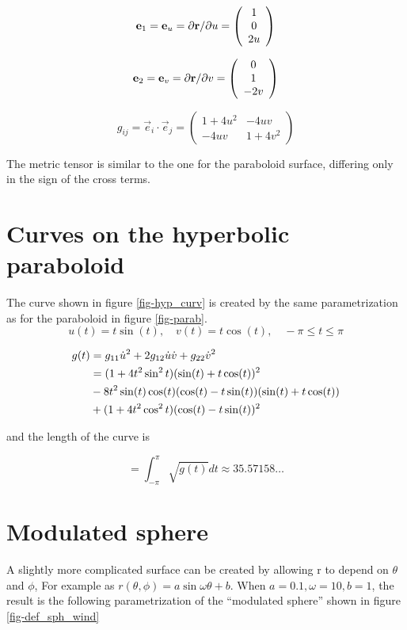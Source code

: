 $$
   \mathbf{e}_1 = \mathbf{e}_u = \partial\mathbf{r}/\partial u = \left( \begin{array}{c} 
        1 \\
        0 \\
        2u 
   \end{array} \right)
$$

$$
   \mathbf{e}_2 = \mathbf{e}_v = \partial\mathbf{r}/\partial v = \left( \begin{array}{c} 
        0 \\
        1 \\
        -2v 
   \end{array} \right)
$$

$$
    g_{ij} = \vec{e}_i\cdot\vec{e}_j = \left( \begin{array}{ccc}
      1 +4u^2 & -4uv \\
      -4uv & 1 + 4v^2 
    \end{array} \right)
$$

The metric tensor is similar to the one for the paraboloid surface, differing only
in the sign of the cross terms.




\section{Curves on the hyperbolic paraboloid}
The curve shown in figure \ref{fig-hyp_curv} is created by the same parametrization as 
for the paraboloid in figure \ref{fig-parab}.
$$
u(t)=t\sin(t),\quad v(t)=t\cos(t),\quad -\pi\le t \le \pi
$$

\begin{align}
   g(t) &= g_{11}\dot{u}^2 +2g_{12}\dot{u}\dot{v}+ g_{22}\dot{v}^2 \notag\\
             &=(1+4t^2\sin^2t)(\sin(t) + t\cos(t))^2\notag\\
             &- 8t^2\sin(t)\cos(t)(\cos(t) - t\sin(t)) (\sin(t) + t\cos(t))\notag\\
             &+ (1+4t^2\cos^2t)(\cos(t) - t\sin(t))^2 \notag
\end{align}

 and the length of the curve is 

$$
  = \int_{-\pi}^{\pi}{\sqrt{ g(t) }}dt \approx 35.57158\ldots
$$


\newcommand{\sh}{a\sin\omega\theta + b} 
\section{Modulated sphere}
A slightly more complicated surface can be created by allowing r to depend on $\theta$ and $\phi$,
For example as $r(\theta,\phi) = \sh$. When $a=0.1, \omega=10, b=1$, the result is the following parametrization of the ``modulated sphere'' shown in figure \ref{fig-def_sph_wind}

